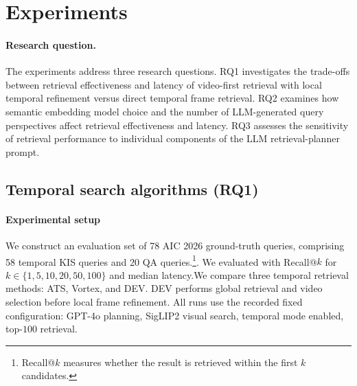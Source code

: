 \documentclass[runningheads]{llncs}
\begin{document}
\section{Experiments}

\paragraph{\textbf{Research question.}}
The experiments address three research questions. RQ1 investigates the
trade-offs between retrieval effectiveness and latency of video-first
retrieval with local temporal refinement versus direct temporal frame
retrieval. RQ2 examines how semantic embedding model choice and the number
of LLM-generated query perspectives affect retrieval effectiveness and
latency. RQ3 assesses the sensitivity of retrieval performance to individual
components of the LLM retrieval-planner prompt.




\subsection{Temporal search algorithms (RQ1)}
\paragraph{Experimental setup} We construct an evaluation set of 78 AIC 2026 ground-truth queries,
comprising 58 temporal KIS queries and 20 QA queries.\footnote{Recall@$k$ measures whether the result is retrieved within the first $k$ candidates.}. We evaluated with Recall@$k$ for $k\in\{1,5,10,20,50,100\}$ and median latency.We compare three temporal retrieval methods: ATS, Vortex, and DEV. DEV performs global retrieval and video selection before local frame refinement. All runs use the recorded fixed configuration: GPT-4o planning, SigLIP2 visual search, temporal mode enabled, top-$100$ retrieval.
\end{document}
